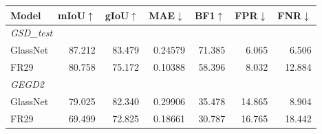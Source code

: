 \par\medskip\noindent\begin{minipage}{\linewidth}
\centering\small\setlength{\tabcolsep}{3pt}
\label{tab:glass}
\begin{tabular}{lrrrrrr}
\toprule
Model & mIoU$\uparrow$ & gIoU$\uparrow$ & MAE$\downarrow$ & BF1$\uparrow$ & FPR$\downarrow$ & FNR$\downarrow$\\\midrule

\multicolumn{7}{l}{\textit{GSD\_test}}\\
GlassNet & 87.212 & 83.479 & 0.24579 & 71.385 & 6.065 & 6.506\\
FR29 & 80.758 & 75.172 & 0.10388 & 58.396 & 8.032 & 12.884\\
\multicolumn{7}{l}{\textit{GEGD2}}\\
GlassNet & 79.025 & 82.340 & 0.29906 & 35.478 & 14.865 & 8.904\\
FR29 & 69.499 & 72.825 & 0.18661 & 30.787 & 16.765 & 18.442\\
\bottomrule
\end{tabular}
\end{minipage}\par\medskip
